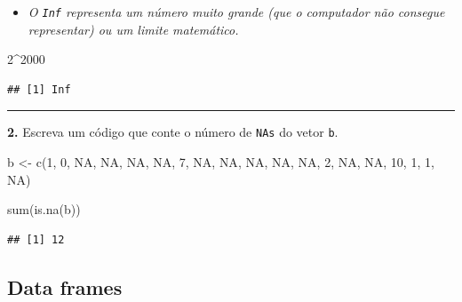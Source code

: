 \documentclass[
]{book}
\newenvironment{Shaded}{\begin{snugshade}}{\end{snugshade}}
\newcommand{\ConstantTok}[1]{\textcolor[rgb]{0.00,0.00,0.00}{#1}}
\newcommand{\DecValTok}[1]{\textcolor[rgb]{0.00,0.00,0.81}{#1}}
\newcommand{\FunctionTok}[1]{\textcolor[rgb]{0.00,0.00,0.00}{#1}}
\newcommand{\NormalTok}[1]{#1}
\newcommand{\OtherTok}[1]{\textcolor[rgb]{0.56,0.35,0.01}{#1}}
\newcommand{\SpecialCharTok}[1]{\textcolor[rgb]{0.00,0.00,0.00}{#1}}
\providecommand{\tightlist}{%
  \setlength{\itemsep}{0pt}\setlength{\parskip}{0pt}}
\begin{document}
\begin{itemize}
\tightlist
\item
  \emph{O \texttt{Inf} representa um número muito grande (que o computador não consegue representar) ou um limite matemático.}
\end{itemize}

\begin{Shaded}
\begin{Highlighting}[]
\DecValTok{2}\SpecialCharTok{\^{}}\DecValTok{2000}
\end{Highlighting}
\end{Shaded}

\begin{verbatim}
## [1] Inf
\end{verbatim}

\begin{center}\rule{0.5\linewidth}{0.5pt}\end{center}

\textbf{2.} Escreva um código que conte o número de \texttt{NAs} do vetor \texttt{b}.

\begin{Shaded}
\begin{Highlighting}[]
\NormalTok{b }\OtherTok{\textless{}{-}} \FunctionTok{c}\NormalTok{(}\DecValTok{1}\NormalTok{, }\DecValTok{0}\NormalTok{, }\ConstantTok{NA}\NormalTok{, }\ConstantTok{NA}\NormalTok{, }\ConstantTok{NA}\NormalTok{, }\ConstantTok{NA}\NormalTok{, }\DecValTok{7}\NormalTok{, }\ConstantTok{NA}\NormalTok{, }\ConstantTok{NA}\NormalTok{, }\ConstantTok{NA}\NormalTok{, }\ConstantTok{NA}\NormalTok{, }\ConstantTok{NA}\NormalTok{, }\DecValTok{2}\NormalTok{, }\ConstantTok{NA}\NormalTok{, }\ConstantTok{NA}\NormalTok{, }\DecValTok{10}\NormalTok{, }\DecValTok{1}\NormalTok{, }\DecValTok{1}\NormalTok{, }\ConstantTok{NA}\NormalTok{)}
\end{Highlighting}
\end{Shaded}

\begin{Shaded}
\begin{Highlighting}[]
\FunctionTok{sum}\NormalTok{(}\FunctionTok{is.na}\NormalTok{(b))}
\end{Highlighting}
\end{Shaded}

\begin{verbatim}
## [1] 12
\end{verbatim}

\hypertarget{data-frames-1}{%
\subsection*{Data frames}\label{data-frames-1}}
\end{document}

